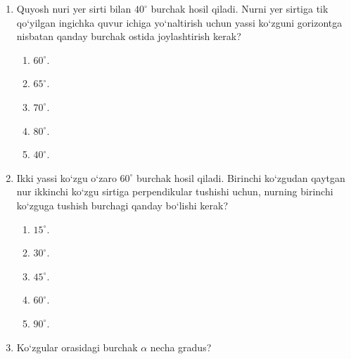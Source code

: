 \begin{enumerate}
\item Quyosh nuri yer sirti bilan $40^\circ$ burchak hosil qiladi. Nurni yer sirtiga tik qo‘yilgan ingichka quvur ichiga yo‘naltirish uchun yassi ko‘zguni gorizontga nisbatan qanday burchak ostida joylashtirish kerak?
\begin{enumerate}[label=\Alph*)]
\item $60^\circ$.
\item $65^\circ$.
\item $70^\circ$.
\item $80^\circ$.
\item $40^\circ$.
\end{enumerate}

\item Ikki yassi ko‘zgu o‘zaro $60^\circ$ burchak hosil qiladi. Birinchi ko‘zgudan qaytgan nur ikkinchi ko‘zgu sirtiga perpendikular tushishi uchun, nurning birinchi ko‘zguga tushish burchagi qanday bo‘lishi kerak?
\begin{enumerate}[label=\Alph*)]
\item $15^\circ$.
\item $30^\circ$.
\item $45^\circ$.
\item $60^\circ$.
\item $90^\circ$.
\end{enumerate}

\item Ko‘zgular orasidagi burchak $\alpha$ necha gradus?

\end{enumerate}
